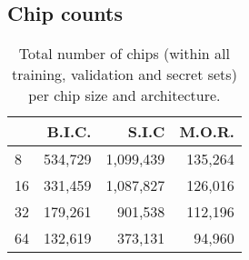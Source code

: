 \pagebreak

\subsection{Chip counts}
\begin{table}
    \centering
\begin{tabular}{lrrr}
    \toprule
     & B.I.C. & S.I.C & M.O.R. \\
    \midrule
    8 & 534,729 & 1,099,439 & 135,264 \\
    16 & 331,459 & 1,087,827 & 126,016 \\
    32 & 179,261 & 901,538 & 112,196 \\
    64 & 132,619 & 373,131 & 94,960 \\
    \bottomrule
    \end{tabular}
\caption{\label{tab:chip_counts}\footnotesize Total number of chips (within all training, validation and secret sets) per chip size and architecture.}
\end{table}
